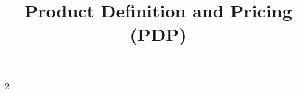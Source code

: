 \documentclass[a4paper,11pt]{article}
\title{Product Definition and Pricing (PDP)}
\begin{document}
\maketitle
{}
\begin{multicols}{2}
    
\end{multicols}
\end{document}
